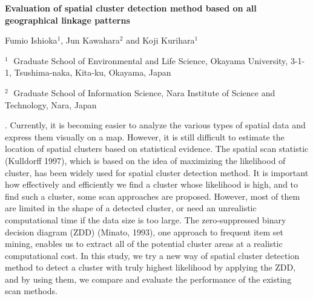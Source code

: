 \documentclass[12pt]{article}
\begin{document}
\begin{flushleft}


{\LARGE\bf Evaluation of spatial cluster detection method based on all geographical linkage patterns}


\vspace{0.8cm}

Fumio Ishioka$^1$, Jun Kawahara$^2$ and Koji Kurihara$^1$

\begin{description}

\item $^1 \;$ Graduate School of Environmental and Life Science, Okayama University, 3-1-1, Tsushima-naka, Kita-ku, Okayama, Japan

\item $^2 \;$ Graduate School of Information Science, Nara Institute of Science and Technology, Nara, Japan

\end{description}

\end{flushleft}


\vspace{0.4cm}

. Currently, it is becoming easier to analyze the various types of spatial data and express them visually on a map. However, it is still difficult to estimate the location of spatial clusters based on statistical evidence. The spatial scan statistic (Kulldorff 1997), which is based on the idea of maximizing the likelihood of cluster, has been widely used for spatial cluster detection method. It is important how effectively and efficiently we find a cluster whose likelihood is high, and to find such a cluster, some scan approaches are proposed. However, most of them are limited in the shape of a detected cluster, or need an unrealistic computational time if the data size is too large. The zero-suppressed binary decision diagram (ZDD) (Minato, 1993), one approach to frequent item set mining, enables us to extract all of the potential cluster areas at a realistic computational cost. In this study, we try a new way of spatial cluster detection method to detect a cluster with truly highest likelihood by applying the ZDD, and by using them, we compare and evaluate the performance of the existing scan methods.

\vskip 1.5mm
\end{document}
